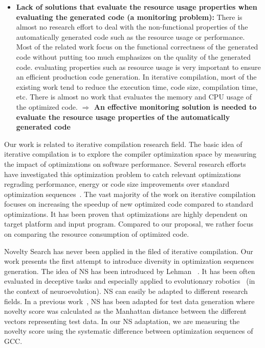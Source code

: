 \begin{itemize}
\item \textbf{Lack of solutions that evaluate the resource usage properties when evaluating the generated code (a monitoring problem):} There is almost no research effort to deal with the non-functional properties of the automatically generated code such as the resource usage or performance. Most of the related work focus on the functional correctness of the generated code without putting too much emphasizes on the quality of the generated code.  evaluating properties such as resource usage is very important to ensure an efficient production code generation. In iterative compilation, most of the existing work tend to reduce the execution time, code size, compilation time, etc. There is almost no work that evaluates the memory and CPU usage of the optimized code.
\newline
\textbf{$\Rightarrow$ An effective monitoring solution is needed to evaluate the resource usage properties of the automatically generated code}
  
\end{itemize}
\iffalse
Our work is related to iterative compilation research field.
The basic idea of iterative compilation is to explore the compiler optimization space by measuring the impact of optimizations on software performance.
Several research efforts have investigated this optimization problem to catch relevant optimizations regrading performance, energy or code size improvements over standard optimization sequences~\cite{almagor2004finding,hoste2008cole,pan2006fast,zhong2009tuning,pallister2015identifying,chen2012deconstructing,sandran2012genetic,martins2014exploration,fursin2008milepost,lin2008automatic,schulte2014post}. 
The vast majority of the work on iterative compilation focuses on increasing the speedup of new optimized code compared to standard optimizations. 
It has been proven that optimizations are highly dependent on target platform and input program. Compared to our proposal, we rather focus on comparing the resource consumption of optimized code.

Novelty Search has never been applied in the filed of iterative compilation. Our work presents the first attempt to introduce diversity in optimization sequences generation. The idea of NS has been introduced by Lehman \etal~\cite{lehman2008exploiting}. It has been often evaluated in deceptive tasks and especially applied to evolutionary robotics~\cite{risi2010evolving,krvcah2012solving} (in the context of neuroevolution). 
NS can easily be adapted to different research fields. In a previous work~\cite{boussaa2015novelty}, NS has been adapted for test data generation where novelty score was calculated as the Manhattan distance between the different vectors representing test data.
In our NS adaptation, we are measuring the novelty score using the systematic difference between optimization sequences of GCC.

